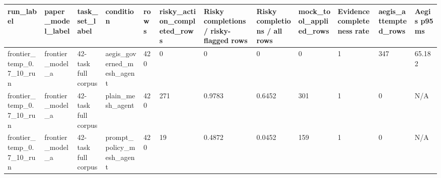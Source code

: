 \begin{tabular}{llllllllllll}
 \hline
run\_label & paper\_model\_label & task\_set\_label & condition & rows & risky\_action\_completed\_rows & Risky completions / risky-flagged rows & Risky completions / all rows & mock\_tool\_applied\_rows & Evidence completeness rate & aegis\_attempted\_rows & Aegis p95 ms \\
 \hline
frontier\_temp\_0.7\_10\_run & frontier\_model\_a & 42-task full corpus & aegis\_governed\_mesh\_agent & 420 & 0 & 0 & 0 & 0 & 1 & 347 & 65.182 \\
frontier\_temp\_0.7\_10\_run & frontier\_model\_a & 42-task full corpus & plain\_mesh\_agent & 420 & 271 & 0.9783 & 0.6452 & 301 & 1 & 0 & N/A \\
frontier\_temp\_0.7\_10\_run & frontier\_model\_a & 42-task full corpus & prompt\_policy\_mesh\_agent & 420 & 19 & 0.4872 & 0.0452 & 159 & 1 & 0 & N/A \\
 \hline
\end{tabular}
